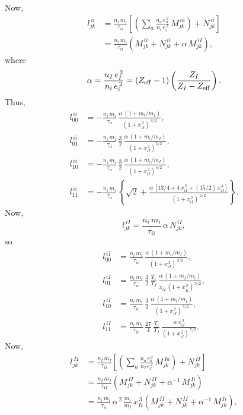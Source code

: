 \documentclass[12pt]{article}
\begin{document}
Now,
\begin{align}
l_{jk}^{\,ii} & = \frac{n_i\,m_i}{\tau_{ii}}\left[\left(\sum_a \frac{n_a\,e_a^{\,2}}{n_i\,e_i^{\,2}}\,M^{\,ia}_{jk}\right) + N^{\,ii}_{jk}\right]\\[0.5ex]
&= \frac{n_i\,m_i}{\tau_{ii}}\left(M^{\,ii}_{jk}+N^{\,ii}_{jk}+\alpha\,M^{\,iI}_{jk}\right),
\end{align}
where 
\begin{equation}
\alpha= \frac{n_I\,e_I^{\,2}}{n_i\,e_i^{\,2}}= (Z_{\rm eff}-1)\left(\frac{Z_I}{Z_I-Z_{\rm eff}}\right).
\end{equation}
Thus,
\begin{align}
l^{\,ii}_{00} &= -\frac{n_i\,m_i}{\tau_{ii}}\,\frac{\alpha\,(1+m_i/m_I)}{(1+x_{iI}^{\,2})^{\,3/2}},\\[0.5ex]
l^{\,ii}_{01}&= -\frac{n_i\,m_i}{\tau_{ii}}\,\frac{3}{2}\,\frac{\alpha\,(1+m_i/m_I)}{(1+x_{iI}^{\,2})^{5/2}},\\[0.5ex]
l^{\,ii}_{10}&= -\frac{n_i\,m_i}{\tau_{ii}}\,\frac{3}{2}\,\frac{\alpha\,(1+m_i/m_I)}{(1+x_{iI}^{\,2})^{5/2}},\\[0.5ex]
l^{\,ii}_{11}& = -\frac{n_i\,m_i}{\tau_{ii}}\,\left\{\sqrt{2}+ \frac{\alpha\,[13/4+4\,x_{iI}^{\,2}+(15/2)\,x_{iI}^{\,4}]}{(1+x_{iI}^{\,2})^{\,5/2}}\right\}.
\end{align}
Now,
\begin{equation}
l_{jk}^{\,iI} = \frac{n_i\,m_i}{\tau_{ii}}\,\alpha\,N^{\,iI}_{jk},
\end{equation}
so 
\begin{align}
l^{\,iI}_{00} &= \frac{n_i\,m_i}{\tau_{ii}}\,\frac{\alpha\,(1+m_i/m_I)}{(1+x_{iI}^{\,2})^{\,3/2}},\\[0.5ex]
l^{\,iI}_{01}&= \frac{n_i\,m_i}{\tau_{ii}}\,\frac{3}{2}\,\frac{T_i}{T_I}\,\frac{\alpha\,(1+m_I/m_i)}{x_{iI}\,(1+x_{Ii}^{\,2})^{\,5/2}},\\[0.5ex]
l^{\,iI}_{10}&= \frac{n_i\,m_i}{\tau_{ii}}\,\frac{3}{2}\,\frac{\alpha\,(1+m_i/m_I)}{(1+x_{iI}^{\,2})^{\,5/2}},\\[0.5ex]
l^{\,iI}_{11}& = \frac{n_i\,m_i}{\tau_{ii}}\,\frac{27}{4}\,\frac{T_i}{T_I}\,\frac{\alpha\,x_{iI}^{\,2}}{(1+x_{iI}^{\,2})^{\,5/2}}.
\end{align}
Now,
\begin{align}
l_{jk}^{\,II} & = \frac{n_I\,m_I}{\tau_{II}}\left[\left(\sum_a \frac{n_a\,e_a^{\,2}}{n_I\,e_I^{\,2}}\,M^{\,Ia}_{jk}\right) + N^{\,II}_{jk}\right]\\[0.5ex]
&=\frac{n_I\,m_I}{\tau_{II}}\left(M^{\,II}_{jk}+N^{\,II}_{jk}+\alpha^{-1}\,M^{\,Ii}_{jk}\right)\nonumber\\[0.5ex]
&= \frac{n_i\,m_i}{\tau_{ii}}\,\alpha^{\,2}\,\frac{m_i}{m_I}\,x_{Ii}^{\,3}\left(M^{\,II}_{jk}+N^{\,II}_{jk}+\alpha^{-1}\,M^{\,Ii}_{jk}\right),
\end{align}
\end{document}
